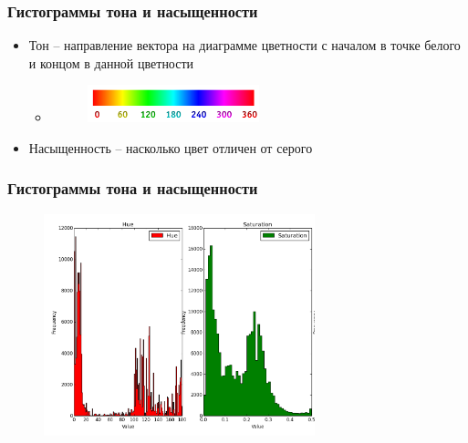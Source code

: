 \documentclass[xetex,mathserif,serif]{beamer}
\begin{document}
\begin{frame}
	\frametitle{Гистограммы тона и насыщенности}

	\begin{itemize}
		\item Тон -- направление вектора на диаграмме цветности с началом в точке белого и концом в данной цветности
		      \begin{itemize}
			      \item \begin{figure}[h]
				            \includegraphics[width=0.5\textwidth]{./images/hue.png}
				            \centering
			            \end{figure}
		      \end{itemize}
		\item Насыщенность -- насколько цвет отличен от серого
	\end{itemize}
\end{frame}


\begin{frame}
	\frametitle{Гистограммы тона и насыщенности}

	\begin{figure}[h]
		\includegraphics[width=0.7\textwidth]{./images/hue_saturation.png}
		\centering
	\end{figure}
\end{frame}
\end{document}
